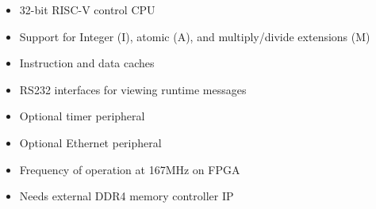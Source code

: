 \begin{itemize}
\item 32-bit RISC-V control CPU
\item Support for Integer (I), atomic (A), and multiply/divide extensions (M)
\item Instruction and data caches
\item RS232 interfaces for viewing runtime messages
\item Optional timer peripheral
\item Optional Ethernet peripheral
\item Frequency of operation at 167MHz on FPGA
\item Needs external DDR4 memory controller IP
\end{itemize}
